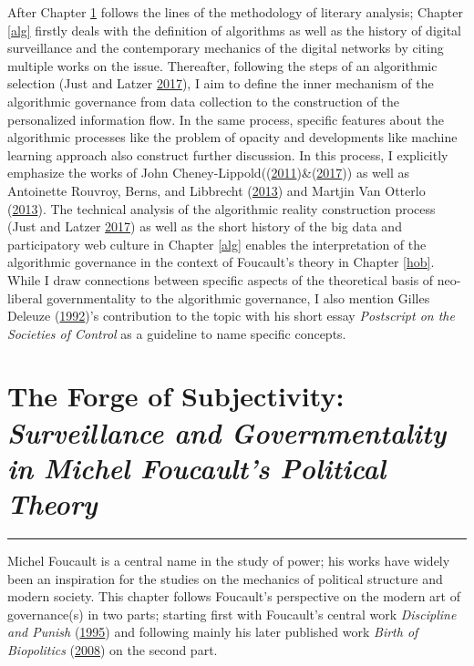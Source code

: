 \documentclass[12pt,twoside]{report}
\begin{document}
After Chapter \ref{theory} follows the lines of the methodology of literary analysis; Chapter \ref{alg} firstly deals with the definition of algorithms as well as the history of digital surveillance and the contemporary mechanics of the digital networks by citing multiple works on the issue. Thereafter, following the steps of an algorithmic selection (Just and Latzer \protect\hyperlink{ref-Just2017}{2017}), I aim to define the inner mechanism of the algorithmic governance from data collection to the construction of the personalized information flow. In the same process, specific features about the algorithmic processes like the problem of opacity and developments like machine learning approach also construct further discussion. In this process, I explicitly emphasize the works of John Cheney-Lippold((\protect\hyperlink{ref-Cheney2011}{2011})\&(\protect\hyperlink{ref-Cheney2017}{2017})) as well as Antoinette Rouvroy, Berns, and Libbrecht (\protect\hyperlink{ref-Rouvroy2013}{2013}) and Martjin Van Otterlo (\protect\hyperlink{ref-Otterlo2013}{2013}). The technical analysis of the algorithmic reality construction process (Just and Latzer \protect\hyperlink{ref-Just2017}{2017}) as well as the short history of the big data and participatory web culture in Chapter \ref{alg} enables the interpretation of the algorithmic governance in the context of Foucault's theory in Chapter \ref{hob}. While I draw connections between specific aspects of the theoretical basis of neo-liberal governmentality to the algorithmic governance, I also mention Gilles Deleuze (\protect\hyperlink{ref-Deleuze1992}{1992})'s contribution to the topic with his short essay \emph{Postscript on the Societies of Control} as a guideline to name specific concepts.

\hypertarget{theory}{%
\chapter{\texorpdfstring{The Forge of Subjectivity: \emph{Surveillance and Governmentality in Michel Foucault's Political Theory}}{The Forge of Subjectivity: Surveillance and Governmentality in Michel Foucault's Political Theory}}\label{theory}}

\begin{center}\rule{0.5\linewidth}{\linethickness}\end{center}

Michel Foucault is a central name in the study of power; his works have widely been an inspiration for the studies on the mechanics of political structure and modern society. This chapter follows Foucault's perspective on the modern art of governance(s) in two parts; starting first with Foucault's central work \emph{Discipline and Punish} (\protect\hyperlink{ref-Foucault1995}{1995}) and following mainly his later published work \emph{Birth of Biopolitics} (\protect\hyperlink{ref-Foucault2008}{2008}) on the second part.
\end{document}

